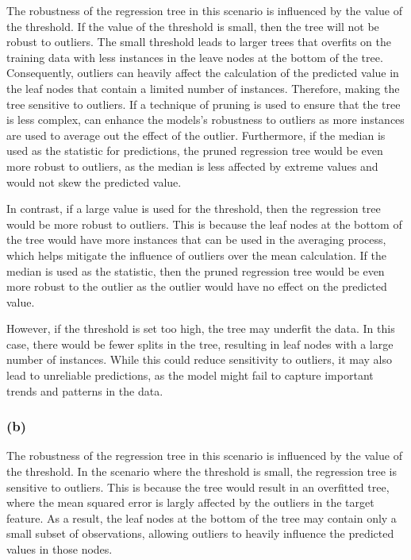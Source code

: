 \documentclass[10pt]{article}
\begin{document}
The robustness of the regression tree in this scenario is influenced by the value of the threshold.
If the value of the threshold is small, then the tree will not be robust to outliers. The small threshold
leads to larger trees that overfits on the training data with less instances in the leave nodes at the bottom of the tree.
Consequently, outliers can heavily affect the calculation of the predicted value in the leaf nodes that
contain a limited number of instances. Therefore, making the tree sensitive to outliers. If a technique
of pruning is used to ensure that the tree is less complex, can enhance the models's robustness to outliers
as more instances are used to average out the effect of the outlier. Furthermore, if the median is used as the
statistic for predictions, the pruned regression tree would be even more robust to outliers, as the median is
less affected by extreme values and would not skew the predicted value.

In contrast, if a large value is used for the threshold, then the regression tree would be more robust to outliers.
This is because the leaf nodes at the bottom of the tree would have more instances that can be used in the averaging process,
which helps mitigate the influence of outliers over the mean calculation. If the median is used as the statistic, then
the pruned regression tree would be even more robust to the outlier as the outlier would have no effect on the
predicted value.

However, if the threshold is set too high, the tree may underfit the data. In this case, there would be fewer splits in
the tree, resulting in leaf nodes with a large number of instances. While this could reduce sensitivity to outliers, it may
also lead to unreliable predictions, as the model might fail to capture important trends and patterns in the data.

\subsubsection*{(b)}

The robustness of the regression tree in this scenario is influenced by the value of the threshold.
In the scenario where the threshold is small, the regression tree is sensitive to outliers. This is because
the tree would result in an overfitted tree, where the mean squared error is largly affected by the outliers
in the target feature. As a result, the leaf nodes at the bottom of the tree may contain only a small subset of observations,
allowing outliers to heavily influence the predicted values in those nodes.
\end{document}
